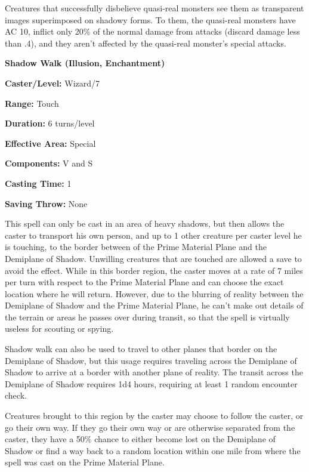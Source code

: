 \begin{multicols}{2}
Creatures that successfully disbelieve quasi-real monsters see them as transparent images superimposed on shadowy forms.  To them, the quasi-real monsters have AC 10, inflict only 20\% of the normal damage from attacks (discard damage less than .4), and they aren't affected by the quasi-real monster's special attacks.

\vspace{1em}

\noindent
\begin{minipage}{\columnwidth}

\noindent \textbf{Shadow Walk (Illusion, Enchantment)}

\noindent \textbf{Caster/Level:} Wizard/7

\noindent \textbf{Range:} Touch

\noindent \textbf{Duration:} 6 turns/level

\noindent \textbf{Effective Area:} Special

\noindent \textbf{Components:} V and S

\noindent \textbf{Casting Time:} 1

\noindent \textbf{Saving Throw:} None

\end{minipage}

This spell can only be cast in an area of heavy shadows, but then allows the caster to transport his own person, and up to 1 other creature per caster level he is touching, to the border between of the Prime Material Plane and the Demiplane of Shadow.  Unwilling creatures that are touched are allowed a save to avoid the effect.  While in this border region, the caster moves at a rate of 7 miles per turn with respect to the Prime Material Plane and can choose the exact location where he will return.  However, due to the blurring of reality between the Demiplane of Shadow and the Prime Material Plane, he can't make out details of the terrain or areas he passes over during transit, so that the spell is virtually useless for scouting or spying.  

Shadow walk can also be used to travel to other planes that border on the Demiplane of Shadow, but this usage requires traveling across the Demiplane of Shadow to arrive at a border with another plane of reality.  The transit across the Demiplane of Shadow requires 1d4 hours, requiring at least 1 random encounter check.

Creatures brought to this region by the caster may choose to follow the caster, or go their own way.  If they go their own way or are otherwise separated from the caster, they have a 50\% chance to either become lost on the Demiplane of Shadow or find a way back to a random location within one mile from where the spell was cast on the Prime Material Plane. 


\end{multicols}
